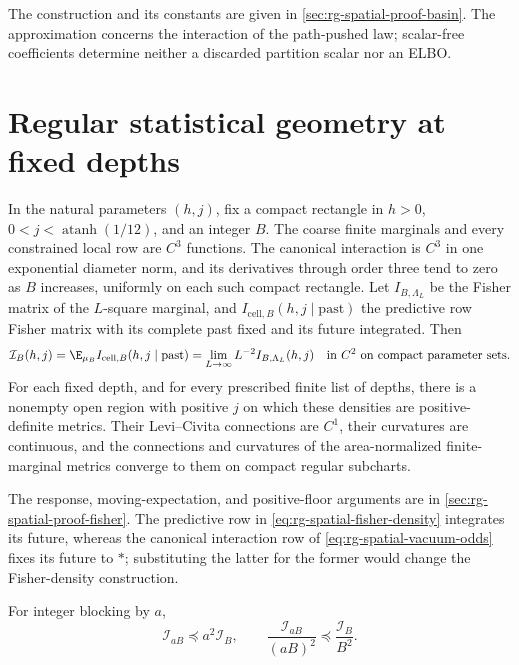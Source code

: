 The construction and its constants are given in
\cref{sec:rg-spatial-proof-basin}. The approximation concerns the
interaction of the path-pushed law; scalar-free coefficients determine
neither a discarded partition scalar nor an ELBO.

\section{Regular statistical geometry at fixed depths}
\label{sec:rg-spatial-fisher}

In the natural parameters \((h,j)\), fix a compact rectangle in \(h>0\),
\(0<j<\operatorname{atanh}(1/12)\), and an integer \(B\). The coarse finite
marginals and every constrained local row are \(C^3\) functions. The
canonical interaction is \(C^3\) in one exponential diameter norm, and its
derivatives through order three tend to zero as \(B\) increases, uniformly
on each such compact rectangle. Let \(I_{B,\Lambda_L}\) be the Fisher
matrix of the \(L\)-square marginal, and
\(I_{\mathrm{cell},B}(h,j\mid\mathrm{past})\) the predictive row Fisher
matrix with its complete past fixed and its future integrated. Then
\begin{equation}
 \mathcal I_B(h,j)=\E_{\mu_B}I_{\mathrm{cell},B}(h,j\mid\mathrm{past})
 =\lim_{L\to\infty}L^{-2}I_{B,\Lambda_L}(h,j)
 \quad\text{in }C^2\text{ on compact parameter sets}.
 \label{eq:rg-spatial-fisher-density}
\end{equation}
For each fixed depth, and for every prescribed finite list of depths, there
is a nonempty open region with positive \(j\) on which these densities are
positive-definite metrics. Their Levi--Civita connections are \(C^1\),
their curvatures are continuous, and the connections and curvatures of the
area-normalized finite-marginal metrics converge to them on compact regular
subcharts. 

The response, moving-expectation, and positive-floor arguments are in
\cref{sec:rg-spatial-proof-fisher}. The predictive row in
\cref{eq:rg-spatial-fisher-density} integrates its future, whereas the
canonical interaction row of \cref{eq:rg-spatial-vacuum-odds} fixes its
future to \(*\); substituting the latter for the former would change the
Fisher-density construction.

For integer blocking by \(a\),
\begin{equation}
 \mathcal I_{aB}\preceq a^2\mathcal I_B,\qquad
 \frac{\mathcal I_{aB}}{(aB)^2}\preceq\frac{\mathcal I_B}{B^2}.
 \label{eq:rg-spatial-fisher-contraction}
\end{equation}

